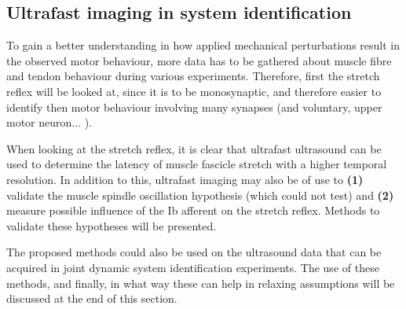 


\subsection{Ultrafast imaging in system identification}
\label{sec:ufus_disc_sys_id}

\tred[draft:] To gain a better understanding in how applied mechanical perturbations result in the observed motor behaviour, more data has to be gathered about muscle fibre and tendon behaviour during various experiments. Therefore, first the stretch reflex will be looked at, since it is \tred[thought] to be monosynaptic, and therefore easier to identify then motor behaviour involving many synapses (and voluntary, upper motor neuron... ). 

When looking at the stretch reflex, it is clear that ultrafast ultrasound can be used to determine the latency of muscle fascicle stretch with a higher temporal resolution. In addition to this, ultrafast imaging may also be of use to \textbf{(1)} validate the muscle spindle oscillation hypothesis (which \citeauthor{cronin_triceps_2015} could not test) and \textbf{(2)} measure possible influence of the Ib afferent on the stretch reflex. Methods to validate these hypotheses will be presented. 

The proposed methods could also be used on the ultrasound data that can be acquired in joint dynamic system identification experiments. The use of these methods, and finally, in what way these can help in relaxing assumptions will be discussed at the end of this section.


